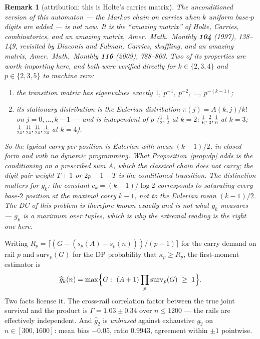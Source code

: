 \documentclass[11pt]{article}
\newtheorem{remark}[theorem]{Remark}
\begin{document}
\begin{remark}[attribution: this is Holte's carries matrix]\label{rem:holte}
The unconditioned version of this automaton --- the Markov chain on carries when $k$ uniform
base-$p$ digits are added --- is not new.  It is the ``amazing matrix'' of Holte, \emph{Carries,
combinatorics, and an amazing matrix}, Amer.\ Math.\ Monthly \textbf{104} (1997), 138--149,
revisited by Diaconis and Fulman, \emph{Carries, shuffling, and an amazing matrix}, Amer.\ Math.\
Monthly \textbf{116} (2009), 788--803.  Two of its properties are worth importing here, and both
were verified directly for $k\in\{2,3,4\}$ and $p\in\{2,3,5\}$ to machine zero:
\begin{enumerate}
\item[(i)] the transition matrix has eigenvalues exactly
      $1,\ p^{-1},\ p^{-2},\ \dots,\ p^{-(k-1)}$;
\item[(ii)] its stationary distribution is the Eulerian distribution
      $\pi(j)=A(k,j)/k!$ on $j=0,\dots,k-1$ --- and is \emph{independent of $p$}
      ($\tfrac12,\tfrac12$ at $k=2$; $\tfrac16,\tfrac23,\tfrac16$ at $k=3$;
      $\tfrac1{24},\tfrac{11}{24},\tfrac{11}{24},\tfrac1{24}$ at $k=4$).
\end{enumerate}
So the \emph{typical} carry per position is Eulerian with mean $(k-1)/2$, in closed form and
with no dynamic programming.  What Proposition~\ref{prop:dp} adds is the conditioning on a
prescribed sum $A$, which the classical chain does not carry; the digit-pair weight
$T+1$ or $2p-1-T$ is the conditioned transition.  The distinction matters for
$g_k$: the constant $c_k=(k-1)/\log2$ corresponds to \emph{saturating} every base-$2$
position at the maximal carry $k-1$, not to the Eulerian mean $(k-1)/2$.  The DC of this
problem is therefore known exactly and is not what $g_k$ measures --- $g_k$ is a maximum over
tuples, which is why the extremal reading is the right one here.
\end{remark}

Writing $R_p=\lceil(G-(s_p(A)-s_p(n)))/(p-1)\rceil$ for the carry demand on rail $p$ and
$\mathrm{surv}_p(G)$ for the DP probability that $\kappa_p\ge R_p$, the first-moment
estimator is
\[
  \widehat g_k(n)=\max\Bigl\{G:\ (A+1)\prod_p\mathrm{surv}_p(G)\ \ge\ 1\Bigr\}.
\]
Two facts license it.  The cross-rail correlation factor between the true joint survival
and the product is $\Gamma=1.03\pm0.34$ over $n\le1200$ --- the rails are effectively
independent.  And $\widehat g_2$ is \emph{unbiased} against exhaustive $g_2$ on
$n\in[300,1600]$: mean bias $-0.05$, ratio $0.9943$, agreement within $\pm1$ pointwise.
\end{document}
